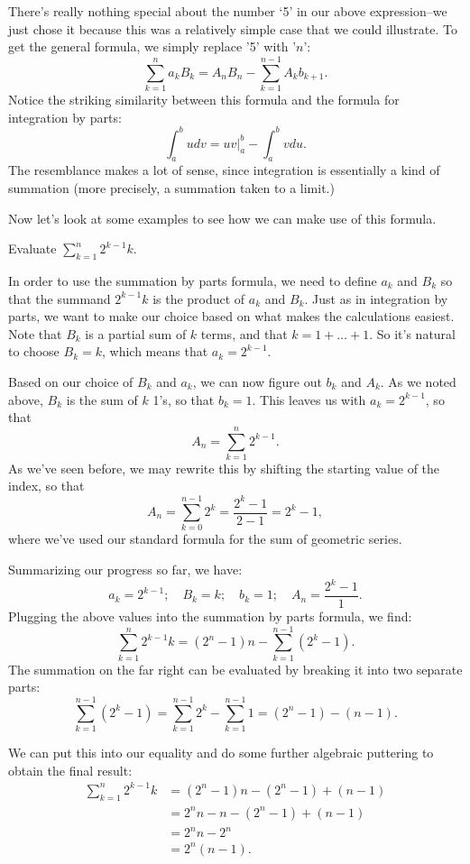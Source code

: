 There's really nothing special about the number `5' in our above expression--we just chose it because 
this was a relatively simple case that we could illustrate. To get the general formula, we simply replace '5' with '$n$':
\[\sum_{k=1}^{n}a_{k}B_{k}= A_{n}B_{n}-\sum_{k=1}^{n-1}A_{k}b_{k+1}. \]
Notice the striking similarity between this formula and the formula for integration by parts:
\[ \int_a^b u dv =\left. uv\right|_a^b - \int_a^b v du. \] 
The resemblance makes a lot of sense, since integration is essentially a kind of summation (more precisely,
a summation taken to a limit.)

Now let's look at some examples to see how we can make use of this formula.

\begin{example}{} Evaluate $\sum_{k=1}^{n}2^{k-1}k$.
 
In order to use the summation by parts formula, we need to define $a_k$ and $B_k$ so that the summand $2^{k-1}k$ is the product of $a_k$ and $B_k$. Just as in integration by parts, we want to make our choice based on what makes the calculations easiest. 
Note that $B_{k}$  is a partial sum of $k$ terms, and that $k = 1 + \ldots + 1$. So it's natural to choose $B_{k}=k$, which means that $a_{k}=2^{k-1}$.
 
Based on our choice of $B_{k}$ and  $a_{k}$, we can now figure out $b_{k}$ and $A_{k}$.  As we noted above, $B_{k}$ is the sum of $k$ 1's, so that $b_k=1$. This leaves us with $a_k = 2^{k-1}$, so that 
\[A_{n}=\sum_{k=1}^{n}2^{k-1}.\]
 As we've seen before, we may rewrite this by shifting the starting value of the index, so that 
\[A_{n}=\sum_{k=0}^{n-1}2^k =  \frac{2^k-1}{2-1} = 2^k-1,\]
where we've used our standard formula for the sum of geometric series.

Summarizing our progress so far, we have:
\[ a_k=2^{k-1};\quad B_k=k;\quad  b_k=1; \quad A_n=\frac{2^k-1}{1}. \]
Plugging the above values into the summation by parts formula, we find:
\[ \sum_{k=1}^{n}2^{k-1}k= \left (2 ^{n}-1 \right )n-\sum_{k=1}^{n-1}\left ( 2^{k}-1 \right ). \]
The summation on the far right can be evaluated by breaking it into two separate parts:
\[ \sum_{k=1}^{n-1}\left ( 2^{k}-1 \right )= \sum_{k=1}^{n-1}2^{k}-\sum_{k=1}^{n-1}1 = (2^{n}-1)- (n-1).\]
\end{example}
We can put this into our equality and do some further algebraic puttering to obtain the final result:
\begin{align*}
\sum_{k=1}^{n}2^{k-1}k &= (2 ^{n}-1)n- (2^{n}-1)+(n-1)\\
&=  2^{n}n-n-(2^{n}-1)+(n-1)\\
&=  2^{n}n-2^{n}\\
&=  2^{n}(n-1).
\end{align*}	

